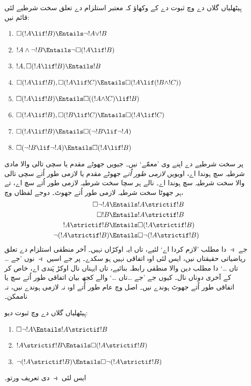 \documentclass[../../../include/open-logic-section]{subfiles}
\begin{document}
\begin{prob}
  ہِیٹھلیاں گلاں دے  وچ ثبوت دے کے وکھاؤ کہ معتبر استلزام دے
  تعلق سخت شرطیے لئی قائم نیں:
  \begin{enumerate}
  \item  $\Box(!A \lif !B) \Entails \lnot !A \lor !B$
  \item $!A \land \lnot !B \Entails \lnot\Box(!A \lif !B)$
  \item $!A, \Box(!A \lif !B) \Entails !B$
  \item $\Box(!A \lif !B), \Box(!A \lif !C) \Entails \Box(!A \lif (!B
    \land !C))$
  \item $\Box(!A \lif !B) \Entails \Box((!A \land !C) \lif !B)$
  \item $\Box(!A \lif !B), \Box(!B \lif !C) \Entails \Box(!A
    \lif !C)$
  \item $\Box(!A \lif !B) \Entails \Box(\lnot !B \lif \lnot !A)$
  \item $\Box(\lnot !B \lif \lnot !A) \Entails \Box(!A \lif !B)$
  \end{enumerate}
\end{prob}

پر سخت شرطیے دے اپنے وی ’معمّے‘ نیں۔ جیویں جھوٹے مقدم یا سچی تالی
والا مادی شرطیہ سچ ہوندا اے، اویویں \emph{لازمی طور اُتے} جھوٹے مقدم یا
لازمی طور اُتے سچی تالی والا سخت شرطیہ سچ ہوندا اے۔ نالے ہر سچا سخت شرطیہ
لازمی طور اُتے سچ اے، تے ہر جھوٹا سخت شرطیہ لازمی طور اُتے جھوٹ۔
دوجے لفظاں وچ،
\begin{align}
  \Box \lnot !A & \Entails !A \strictif !B\\
  \Box !B & \Entails !A \strictif !B\\
  !A \strictif !B& \Entails \Box(!A \strictif !B)\\
  \lnot(!A \strictif !B) & \Entails \Box\lnot(!A \strictif !B)
\end{align}
جے $\strictif$ دا مطلب ’لازم کردا اے‘ لئیے، تاں ایہ اوکڑاں نہیں۔
آخر منطقی استلزام دے تعلق ریاضیاتی حقیقتاں نیں، ایس لئی اوہ اتفاقی نہیں ہو سکدے۔
پر جے اسیں $\strictif$ نوں ’جے \dots تاں \dots‘ دا مطلب دین والا منطقی
رابطہ بنائیے، تاں ایہناں نال اوکڑ پَندی اے، خاص کر کے آخری دوناں نال۔
کیوں جے ’جے \dots تاں \dots‘ والے کجھ بیان اتفاقی طور اُتے سچ یا اتفاقی
طور اُتے جھوٹ ہوندے نیں۔ اصل وچ عام طور اُتے اوہ نہ لازمی ہوندے نیں،
نہ ناممکن۔

\begin{prob}
  ہِیٹھلیاں گلاں دے  وچ ثبوت دیو:
  \begin{enumerate}
    \item  $\Box \lnot !A \Entails !A \strictif !B$
    \item $!A \strictif !B \Entails \Box(!A \strictif !B)$
    \item $\lnot(!A \strictif !B)  \Entails \Box\lnot(!A \strictif !B)$
  \end{enumerate}
  ایس لئی $\strictif$ دی تعریف ورتو۔
\end{prob}
\end{document}
